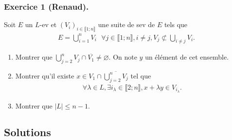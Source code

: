 \documentclass{article}
\begin{document}
\subsubsection*{Exercice 1 (Renaud).}
Soit $E$ un $L$-ev et $(V_i)_{i\in\llbracket 1;n\rrbracket}$ une suite de sev de $E$ tels que
\begin{align*}
E = \bigcup_{i=1}^n V_i\,\,\,\, \forall j\in\llbracket 1;n\rrbracket, i\neq j, V_j\not\subset \bigcup_{i\neq j}  V_i.
\end{align*}
\begin{enumerate}
\item Montrer que $\bigcup_{j=2}^{n} V_j \cap \overline{V_1}\neq \varnothing$. On note $y$ un élément de cet ensemble.
\item Montrer qu'il existe $x\in V_1\cap \overline{\bigcup_{j=2}^n V_j}$ tel que 
\begin{align*}
\forall \lambda\in L, \exists i_\lambda\in \llbracket 2;n\rrbracket, x+\lambda y \in V_{i_\lambda}.
\end{align*}
\item Montrer que $|L|\leq n-1$.
\end{enumerate}
\subsection*{Solutions}
\end{document}
